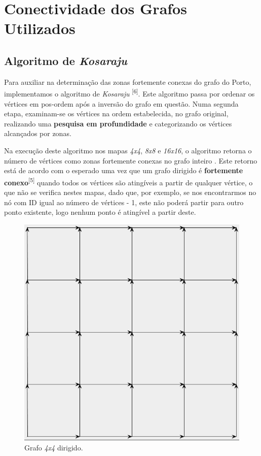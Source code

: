 \documentclass[article, a4paper, 12pt, oneside]{memoir}
\begin{document}
\newpage
\chapter[Conectividade dos Grafos Utilizados][Conectividade dos Grafos Utilizados]{Conectividade dos Grafos Utilizados} \label{\thechapter}

\section{Algoritmo de \textit{Kosaraju}}

Para auxiliar na determinação das zonas fortemente conexas do grafo do Porto, implementamos o algoritmo de \textit{Kosaraju} \textsuperscript{[6]}. Este algoritmo passa por ordenar os vértices em pos-ordem após a inversão do grafo em questão. Numa segunda etapa, examinam-se os vértices na ordem estabelecida, no grafo original, realizando uma \textbf{pesquisa em profundidade} e categorizando os vértices alcançados por zonas.

Na execução deste algoritmo nos mapas \textit{4x4}, \textit{8x8} e \textit{16x16}, o algoritmo retorna o número de vértices como zonas fortemente conexas no grafo inteiro . Este retorno está de acordo com o esperado uma vez que um grafo dirigido é \textbf{fortemente conexo}\textsuperscript{[5]} quando todos os vértices são atingíveis a partir de qualquer vértice, o que não se verifica nestes mapas, dado que, por exemplo, se nos encontrarmos no nó com ID igual ao número de vértices - 1, este não poderá partir para outro ponto existente, logo nenhum ponto é atingível a partir deste.

\begin{figure}[h!]
  \centerline{\includegraphics[scale=0.4]{conectividade.png}}
  \caption{Grafo \textit{4x4} dirigido.}
\end{figure}
\end{document}
